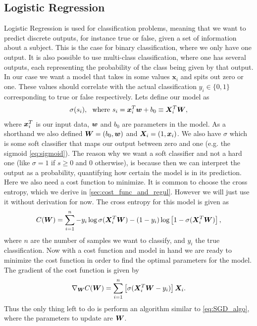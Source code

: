 \documentclass[12pt]{extarticle}
\begin{document}
\subsection{Logistic Regression}\label{sec:logistic_regression}
Logistic Regression is used for classification problems, meaning that we want to predict discrete outputs, for instance true or false, given a set of information about a subject. This is the case for binary classification, where we only have one output. It is also possible to use multi-class classification, where one has several outputs, each representing the probability of the class being given by that output. In our case we want a model that takes in some values $\mathbf{x}_i$ and spits out zero or one. These values should correlate with the actual classification $y_i\in\{0,1\}$ corresponding to true or false respectively. Lets define our model as
\begin{align}
	\sigma(s_i), \ \ \text{where }s_i = \boldsymbol x_i^T \boldsymbol w + b_0 \equiv \boldsymbol X_i^T \boldsymbol W,
	\label{eq:log_reg_model}
\end{align}
where $\boldsymbol x_i^T$ is our input data, $\boldsymbol w$ and $b_0$ are parameters in the model. As a shorthand we also defined $\boldsymbol W = (b_0, \boldsymbol w)$ and $\boldsymbol X_i = (1, \boldsymbol x_i)$. We also have $\sigma$ which is some soft classifier that maps our output between zero and one (e.g. the sigmoid \eqref{eq:sigmoid}). The reason why we want a soft classifier and not a hard one (like $\sigma = 1$ if $s\geq0$ and $0$ otherwise), is because then we can interpret the output as a probability, quantifying how certain the model is in its prediction. Here we also need a cost function to minimize. It is common to choose the cross entropy, which we derive in \ref{sec:cost_func_and_regul}. However we will just use it without derivation for now. The cross entropy for this model is given as
\begin{align}
	C(\boldsymbol W) = \sum_{i = 1}^{n} -y_i \log\sigma(\boldsymbol X_i^T \boldsymbol W) - (1 - y_i)\log\left[1 - \sigma(\boldsymbol X^T_i \boldsymbol W)\right],
	\label{eq:cross_entropy2}
\end{align}
where $n$ are the number of samples we want to classify, and $y_i$ the true classification. Now with a cost function and model in hand we are ready to minimize the cost function in order to find the optimal parameters for the model. The gradient of the cost function is given by
\begin{align}
	\nabla_{\boldsymbol W} C(\boldsymbol W) = \sum_{i = 1}^n \left[\sigma(\boldsymbol X_i^T \boldsymbol W - y_i)\right]\boldsymbol X_i.
	\label{eq:cross_entropy_grad}
\end{align}
Thus the only thing left to do is perform an algorithm similar to \ref{eq:SGD_algo}, where the parameters to update are $\boldsymbol W$.
\end{document}
